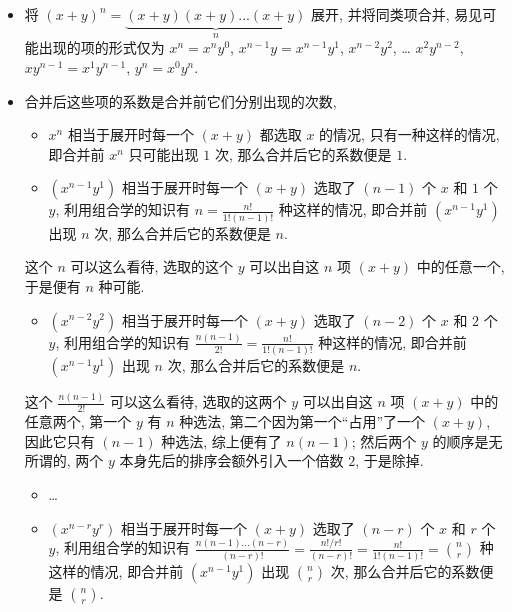 \begin{tcolorbox}[size=fbox, breakable, enhanced jigsaw, title={从组合的思路出发}]

\begin{itemize}
\item
  将 $(x+y)^n=\underbrace{(x+y)(x+y)...(x+y)}_{n}$ 展开,
  并将同类项合并, 易见可能出现的项的形式仅为 $x^n=x^ny^0$,
  $x^{n-1}y=x^{n-1}y^1$, $x^{n-2}y^2$, \ldots{} $x^2y^{n-2}$,
  $xy^{n-1}=x^1y^{n-1}$, $y^n=x^0y^n$.
\item
  合并后这些项的系数是合并前它们分别出现的次数,

  \begin{itemize}
  
  \item
    $x^n$ 相当于展开时每一个 $(x+y)$ 都选取 $x$ 的情况,
    只有一种这样的情况, 即合并前 $x^n$ 只可能出现 $1$ 次,
    那么合并后它的系数便是 $1$.
  \item
    $(x^{n-1}y^1)$ 相当于展开时每一个 $(x+y)$ 选取了 $(n-1)$ 个
    $x$ 和 $1$ 个 $y$, 利用组合学的知识有
    $n=\frac{n!}{1!(n-1)!}$ 种这样的情况, 即合并前 $(x^{n-1}y^1)$
    出现 $n$ 次, 那么合并后它的系数便是 $n$.
  \end{itemize}

  \begin{newquote}
  这个 $n$ 可以这么看待, 选取的这个 $y$ 可以出自这 $n$ 项
  $(x+y)$ 中的任意一个, 于是便有 $n$ 种可能.
  \end{newquote}

  \begin{itemize}
  
  \item
    $(x^{n-2}y^2)$ 相当于展开时每一个 $(x+y)$ 选取了 $(n-2)$ 个
    $x$ 和 $2$ 个 $y$, 利用组合学的知识有
    $\frac{n(n-1)}{2!}=\frac{n!}{1!(n-1)!}$ 种这样的情况, 即合并前
    $(x^{n-1}y^1)$ 出现 $n$ 次, 那么合并后它的系数便是 $n$.
  \end{itemize}

  \begin{newquote}
  这个 $\frac{n(n-1)}{2!}$ 可以这么看待, 选取的这两个 $y$ 可以出自这
  $n$ 项 $(x+y)$ 中的任意两个, 第一个 $y$ 有 $n$ 种选法,
  第二个因为第一个``占用''了一个 $(x+y)$, 因此它只有 $(n-1)$ 种选法,
  综上便有了 $n(n-1)$; 然后两个 $y$ 的顺序是无所谓的, 两个 $y$
  本身先后的排序会额外引入一个倍数 $2$, 于是除掉.
  \end{newquote}

  \begin{itemize}
  
  \item
    \ldots{}
  \item
    $(x^{n-r}y^r)$ 相当于展开时每一个 $(x+y)$ 选取了 $(n-r)$ 个
    $x$ 和 $r$ 个 $y$, 利用组合学的知识有
    $\frac{n(n-1)...(n-r)}{(n-r)!}=\frac{n!/r!}{(n-r)!}=\frac{n!}{1!(n-1)!}=\binom{n}{r}$
    种这样的情况, 即合并前 $(x^{n-1}y^1)$ 出现 $\binom{n}{r}$ 次,
    那么合并后它的系数便是 $\binom{n}{r}$.
  \end{itemize}


\end{itemize}
\end{tcolorbox}
